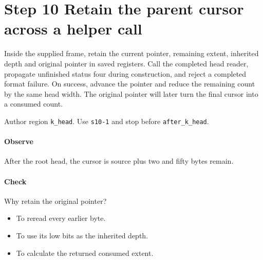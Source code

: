 \section{Step 10 Retain the parent cursor across a helper call}\label{cbor-s10}
Inside the supplied frame, retain the current pointer, remaining extent, inherited depth and original pointer in saved registers. Call the completed head reader, propagate unfinished status four during construction, and reject a completed format failure. On success, advance the pointer and reduce the remaining count by the same head width. The original pointer will later turn the final cursor into a consumed count.

Author region \texttt{k\_head}. Use \texttt{s10-1} and stop before \texttt{after\_k\_head}. 

\paragraph{Observe} After the root head, the cursor is source plus two and fifty bytes remain.

\paragraph{Check} Why retain the original pointer?
\begin{itemize}
\item[A.] To reread every earlier byte.
\item[B.] To use its low bits as the inherited depth.
\item[C.] To calculate the returned consumed extent.
\end{itemize}
